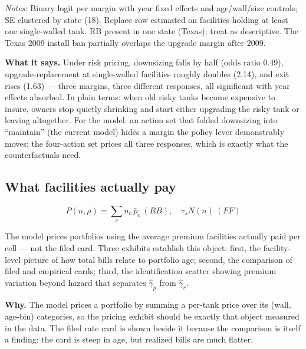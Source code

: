 \documentclass[
  letterpaper,
  DIV=11,
  numbers=noendperiod]{scrartcl}
\begin{document}
\begin{table}[H]
\centering
\caption{Regime contrasts by action margin}

\par\vspace{4pt}
{\footnotesize\textit{Notes:} Binary logit per margin with year fixed effects
and age/wall/size controls; SE clustered by state (18). Replace row estimated
on facilities holding at least one single-walled tank. RB present in one state
(Texas); treat as descriptive. The Texas 2009 install ban partially overlaps the
upgrade margin after 2009.\par}
\end{table}

\textbf{What it says.} Under risk pricing, downsizing falls by half
(odds ratio 0.49), upgrade-replacement at single-walled facilities
roughly doubles (2.14), and exit rises (1.63) --- three margins, three
different responses, all significant with year effects absorbed. In
plain terms: when old risky tanks become expensive to insure, owners
stop quietly shrinking and start either upgrading the risky tank or
leaving altogether. For the model: an action set that folded downsizing
into ``maintain'' (the current model) hides a margin the policy lever
demonstrably moves; the four-action set prices all three responses,
which is exactly what the counterfactuals need.

\subsection{What facilities actually pay}\label{sec-ae-x3}

\[
P(n,\rho) = \sum_c n_c\, \bar p_c \ (RB), \quad \tau_s N(n) \ (FF)
\]

The model prices portfolios using the average premium facilities
actually paid per cell --- not the filed card. Three exhibits establish
this object: first, the facility-level picture of how total bills relate
to portfolio age; second, the comparison of filed and empirical cards;
third, the identification scatter showing premium variation beyond
hazard that separates \(\hat\gamma_p\) from \(\hat\gamma_r\).

\textbf{Why.} The model prices a portfolio by summing a per-tank price
over its (wall, age-bin) categories, so the pricing exhibit should be
exactly that object measured in the data. The filed rate card is shown
beside it because the comparison is itself a finding: the card is steep
in age, but realized bills are much flatter.
\end{document}
